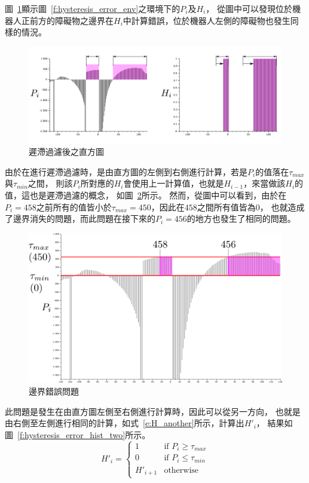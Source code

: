 圖~\ref{f:hysteresis_error_hist}顯示圖~\ref{f:hysteresis_error_env}之環境下的$P_i$及$H_i$，
從圖中可以發現位於機器人正前方的障礙物之邊界在$H_i$中計算錯誤，位於機器人左側的障礙物也發生同樣的情況。
\begin{figure}[h!]
	\centering
	\includegraphics[width=\textwidth]{figures/algorithm/hysteresis_error_hist}
	\caption{遲滯過濾後之直方圖}
	\label{f:hysteresis_error_hist}
\end{figure}

由於在進行遲滯過濾時，是由直方圖的左側到右側進行計算，若是$P_i$的值落在$\tau_{max}$與$\tau_{min}$之間，
則該$P_i$所對應的$H_i$會使用上一計算值，也就是$H_{i-1}$，來當做該$H_i$的值，這也是遲滯過濾的概念，
如圖~\ref{f:hysteresis_error_hist_ana}所示。
然而，從圖中可以看到，由於在$P_i = 458$之前所有的值皆小於$\tau_{max} = 450$，因此在$458$之間所有值皆為$0$，
也就造成了邊界消失的問題，而此問題在接下來的$P_i = 456$的地方也發生了相同的問題。
\begin{figure}[h!]
	\centering
	\includegraphics[width=.7\textwidth]{figures/algorithm/hysteresis_error_hist_analysis}
	\caption{邊界錯誤問題}
	\label{f:hysteresis_error_hist_ana}
\end{figure}

此問題是發生在由直方圖左側至右側進行計算時，因此可以從另一方向，
也就是由右側至左側進行相同的計算，如式~\ref{e:H_another}所示，計算出$H'_i$，
結果如圖~\ref{f:hysteresis_error_hist_two}所示。
\begin{equation}
	H'_i = 
	\begin{cases}
		1		& \textrm{if } P_i \geq \tau_{max} \\
		0		& \textrm{if } P_i \leq \tau_{min} \\
		H'_{i+1}	& \textrm{otherwise}
	\end{cases}
	\label{e:H_another}
\end{equation}

